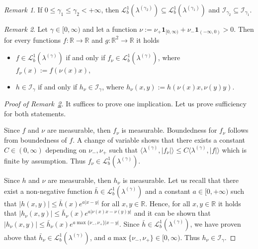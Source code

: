\documentclass[12pt]{article}
\numberwithin{equation}{section}
\theoremstyle{definition}
\theoremstyle{remark}
\newtheorem{remark}{Remark}
\newcommand{\RR}{\mathbb{R}}
\newcommand{\ind}[1]{\mathbf{1}_{#1}}
\newcommand{\Lgb}[1]{\mathcal{L}^{1}_{b}(\lambda^{(#1)})}
\newcommand{\Lg}[1]{\mathcal{I}_{#1}}
\begin{document}
\begin{remark} \label{rem:spaces:relation}
If $0 \leq \gamma_1 \leq \gamma_2 < +\infty$, then $\Lgb{\gamma_2} \subseteq  \Lgb{\gamma_1}$ and $\Lg{\gamma_2} \subseteq  \Lg{\gamma_1}$.
\end{remark}





\begin{remark} \label{rem:Lgb:remarks}
Let $\gamma \in [0,\infty)$ and 
let a function $\nu := \nu_+ \ind{[0,\infty)} + \nu_- \ind{(-\infty,0)}>0$.
Then for every functions $f\colon \RR \to \RR$ and $g\colon \RR^2 \to \RR$ it holds
\begin{itemize}
	\item $f\in \Lgb{\gamma}$ if and only if $f_\nu \in \Lgb{\gamma}$, where $f_\nu(x):= f(\nu(x) x)$,
	\item $h\in \Lg{\gamma}$ if and only if $h_\nu \in \Lg{\gamma}$, where $h_\nu(x,y):= h(\nu(x) x, \nu(y)y)$. 
\end{itemize}
\end{remark}
%
%
%
\begin{proof}[Proof of Remark~\ref{rem:Lgb:remarks}]
It suffices to prove one implication. Let us prove sufficiency for both statements.

Since $f$ and $\nu$ are measurable, then $f_\nu$ is measurable.
Boundedness for $f_\nu$ follows from boundedness of $f$.
A change of variable shows that there exists a constant $C\in (0,\infty)$ depending on $\nu_-,\nu_+$ such that
$
	\langle \lambda^{(\gamma)}, |f_\nu| \rangle 
	\leq C \langle \lambda^{(\gamma)}, |f| \rangle
$
which is finite by assumption.
Thus $f_\nu \in \Lgb{\gamma}$.

Since $h$ and $\nu$ are measurable, then $h_\nu$ is measurable.
Let us recall that there exist a non-negative function $\bar h \in \Lgb{\gamma}$ and a constant $a\in [0,+\infty)$ such that $|h(x,y)|\leq \bar h(x) e^{a|x-y|}$ for all $x,y\in \mathbb R$.
Hence, for all $x,y\in \mathbb R$ it holds that 
$
	|h_\nu(x,y)|\leq \bar h_\nu(x) e^{a|\nu(x) x-\nu(y)y|}
$ 
and it can be shown that
$
	|h_\nu(x,y)|\leq \bar h_\nu(x) e^{a \max\{\nu_-,\nu_+\}|x-y|}.
$ 
Since $\bar h\in \Lgb{\gamma}$, we have proven above that $\bar h_\nu \in \Lgb{\gamma}$, and $a \max\{\nu_-,\nu_+\} \in [0,\infty)$. 
Thus $h_\nu \in \Lg{\gamma}$.
\end{proof}
%
%
%
\end{document}
